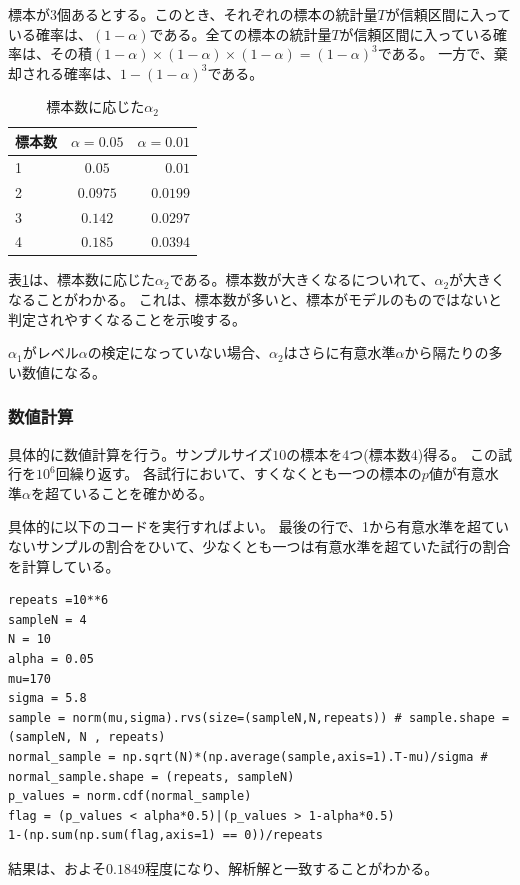 標本が$3$個あるとする。このとき、それぞれの標本の統計量$T$が信頼区間に入っている確率は、$(1-\alpha)$である。全ての標本の統計量$T$が信頼区間に入っている確率は、その積$(1-\alpha)\times(1-\alpha)\times(1-\alpha)=(1-\alpha)^3$である。
一方で、棄却される確率は、$1-(1-\alpha)^3$である。
\begin{table}[hbtp]
    \caption{標本数に応じた$\alpha_2$}
    \label{table:multiple_test_reject_prob}
    \centering
    \begin{tabular}{lcr}
      \hline
      標本数  & $\alpha=0.05$  &  $\alpha=0.01$ \\
      \hline \hline
       1 & $0.05$  & $0.01$ \\
       2 & $0.0975$ & $0.0199$\\
       3 & $0.142$ & $0.0297$\\
       4 & $0.185$ & $0.0394$\\
    \end{tabular}
  \end{table}
表\ref{table:multiple_test_reject_prob}は、標本数に応じた$\alpha_2$である。標本数が大きくなるについれて、$\alpha_2$が大きくなることがわかる。
これは、標本数が多いと、標本がモデルのものではないと判定されやすくなることを示唆する。

$\alpha_1$がレベル$\alpha$の検定になっていない場合、$\alpha_2$はさらに有意水準$\alpha$から隔たりの多い数値になる。

\subsubsection{数値計算}
具体的に数値計算を行う。サンプルサイズ$10$の標本を$4$つ(標本数$4$)得る。
この試行を$10^6$回繰り返す。
各試行において、すくなくとも一つの標本の$p$値が有意水準$\alpha$を超ていることを確かめる。

具体的に以下のコードを実行すればよい。
最後の行で、1から有意水準を超ていないサンプルの割合をひいて、少なくとも一つは有意水準を超ていた試行の割合を計算している。
\begin{lstlisting}
repeats =10**6
sampleN = 4
N = 10
alpha = 0.05
mu=170
sigma = 5.8
sample = norm(mu,sigma).rvs(size=(sampleN,N,repeats)) # sample.shape = (sampleN, N , repeats)
normal_sample = np.sqrt(N)*(np.average(sample,axis=1).T-mu)/sigma # normal_sample.shape = (repeats, sampleN)
p_values = norm.cdf(normal_sample)
flag = (p_values < alpha*0.5)|(p_values > 1-alpha*0.5)
1-(np.sum(np.sum(flag,axis=1) == 0))/repeats
\end{lstlisting}
結果は、およそ$0.1849$程度になり、解析解と一致することがわかる。

